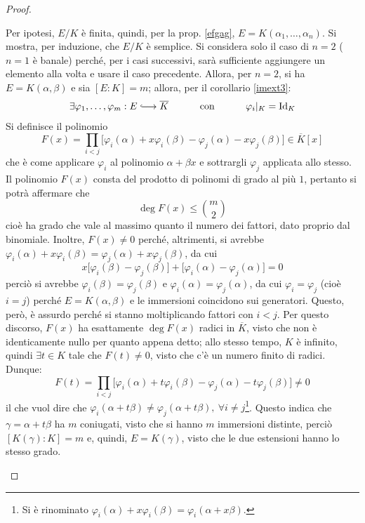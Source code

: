 \documentclass[12pt]{scrartcl}
\theoremstyle{style}
\numberwithin{equation}{subsection}
\newcommand{\longhookrightarrow}{\lhook\joinrel\longrightarrow}
\begin{document}
\begin{proof}
\begin{itemize}
			Per ipotesi, $E / K$ \`e finita, quindi, per la prop. \ref{efgag}, $E = K(\alpha _1,\ldots,\alpha _n)$.
			Si mostra, per induzione, che $E / K$ \`e semplice.
			Si considera solo il caso di $n=2$ ($n=1$ \`e banale) perch\'e, per i casi successivi, sar\`a sufficiente aggiungere un elemento alla volta e usare il caso precedente.
			Allora, per $n=2$, si ha $E = K(\alpha ,\beta )$ e sia $[E : K] = m$; allora, per il corollario \ref{imext3}:
			\[
			\exists \varphi _1,\ldots,\varphi _m : E \longhookrightarrow \overline{K} \hspace{1cm} \text{ con }\hspace{1cm} \varphi _i|_K = \mathrm{Id} _K
			\] 
			Si definisce il polinomio 
			\[
				F(x) = \prod_{i<j} \big[\varphi _i(\alpha ) + x\varphi _i(\beta ) - \varphi _j(\alpha ) - x \varphi _j(\beta )\big]\in \overline{K}[x]
			\] 
			che \`e come applicare $\varphi _i$ al polinomio $\alpha + \beta x$ e sottrargli $\varphi _j$ applicata allo stesso.
			Il polinomio $F(x)$ consta del prodotto di polinomi di grado al pi\`u $1$, pertanto si potr\`a affermare che 
			\[
				\deg F(x) \le \binom{m}{2}
			\] 
			cio\`e ha grado che vale al massimo quanto il numero dei fattori, dato proprio dal binomiale.
			Inoltre, $F(x) \neq 0$ perch\'e, altrimenti, si avrebbe $\varphi _i(\alpha ) + x \varphi _i(\beta ) = \varphi _j(\alpha ) + x \varphi _j (\beta )$, da cui
			\[
				x \big[\varphi _i(\beta ) - \varphi _j(\beta )\big] + \big[\varphi _i(\alpha ) - \varphi _j(\alpha )\big] = 0
			\] 
			perci\`o si avrebbe $\varphi _i(\beta ) = \varphi _j(\beta )$ e $\varphi _i(\alpha ) = \varphi _j(\alpha )$, da cui $\varphi _i = \varphi _j$ (cio\`e $i=j$) perch\'e $E = K(\alpha ,\beta )$ e le immersioni coincidono sui generatori. 
			Questo, per\`o, \`e assurdo perch\'e si stanno moltiplicando fattori con $i<j$.
			Per questo discorso, $F(x)$ ha esattamente $\deg F(x)$ radici in $\overline{K}$, visto che non \`e identicamente nullo per quanto appena detto; allo stesso tempo, $K$ \`e infinito, quindi $\exists  t \in K$ tale che $F(t)\neq 0$, visto che c'\`e un numero finito di radici.
			Dunque:
			\[
				F(t) = \prod_{i<j} \big[\varphi _i(\alpha ) + t\varphi _i(\beta ) - \varphi _j(\alpha ) - t \varphi _j(\beta )\big]\neq 0
			\] 
			il che vuol dire che $\varphi _i(\alpha +t\beta ) \neq \varphi _j(\alpha +t\beta ), \ \forall i\neq j$\footnote{Si \`e rinominato $\varphi _i(\alpha ) + x \varphi _i(\beta ) = \varphi _i(\alpha  + x \beta )$.}.
			Questo indica che $\gamma = \alpha  + t \beta $ ha $m$ coniugati, visto che si hanno $m$ immersioni distinte, perci\`o $[K(\gamma) : K] = m$ e, quindi, $E = K(\gamma)$, visto che le due estensioni hanno lo stesso grado.
	\end{itemize}
\end{proof}
\end{document}
